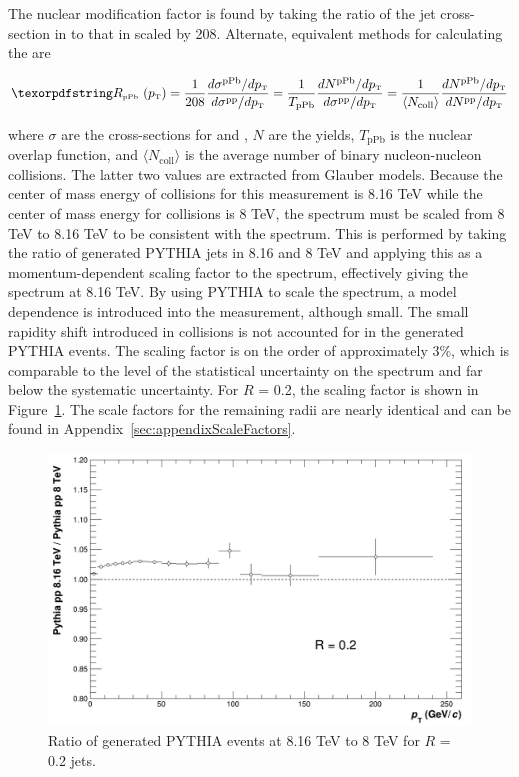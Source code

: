 The nuclear modification factor is found by taking the ratio of the jet cross-section in \pPb to that in \pp scaled by 208. Alternate, equivalent methods for calculating the \RpPb are 

\begin{equation}
    \text{\RpPb}(\text{\pT}) = \frac{1}{208} \frac{ d\sigma^{\text{pPb}}/d\text{\pT} }{ d\sigma^{\text{\pp}}/d\text{\pT} } = \frac{1}{T_\text{pPb}} \frac{ dN^{\text{pPb}}/d\text{\pT} }{ d\sigma^{\text{\pp}}/d\text{\pT} } = \frac{1}{\langle N_\text{coll}\rangle} \frac{ dN^{\text{pPb}}/d\text{\pT} }{ dN^{\text{\pp}}/d\text{\pT} }
    \label{eq:RpPb_equation}
\end{equation}

\noindent
where $\sigma$ are the cross-sections for \pp and \pPb, $N$ are the yields, $T_{\text{pPb}}$ is the nuclear overlap function, and $\langle N_\text{coll}\rangle$ is the average number of binary nucleon-nucleon collisions. The latter two values are extracted from Glauber models. Because the center of mass energy of \pPb collisions for this measurement is 8.16 TeV while the center of mass energy for \pp collisions is 8 TeV, the \pp spectrum must be scaled from 8 TeV to 8.16 TeV to be consistent with the \pPb spectrum. This is performed by taking the ratio of generated PYTHIA jets in 8.16 and 8 TeV and applying this as a momentum-dependent scaling factor to the \pp spectrum, effectively giving the \pp spectrum at 8.16 TeV. By using PYTHIA to scale the spectrum, a model dependence is introduced into the measurement, although small. The small rapidity shift introduced in \pPb collisions is not accounted for in the generated PYTHIA events. The scaling factor is on the order of approximately 3\%, which is comparable to the level of the statistical uncertainty on the spectrum and far below the systematic uncertainty. For $R$ = 0.2, the scaling factor is shown in Figure~\ref{fig:PythiaScaleFactor}. The scale factors for the remaining radii are nearly identical and can be found in Appendix~\ref{sec:appendixScaleFactors}.

\begin{figure}[hbt!]
    \centering
    \includegraphics[width=\textwidth]{figures/ScaleFactorPythia/PythiaRatio_R02.png}
    \caption{Ratio of generated \pp PYTHIA events at 8.16 TeV to 8 TeV for $R$ = 0.2 jets.}
    \label{fig:PythiaScaleFactor}
\end{figure}

